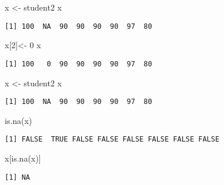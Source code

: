 \documentclass[
  letterpaper,
  DIV=11,
  numbers=noendperiod]{scrartcl}
\newenvironment{Shaded}{\begin{snugshade}}{\end{snugshade}}
\newcommand{\DecValTok}[1]{\textcolor[rgb]{0.68,0.00,0.00}{#1}}
\newcommand{\FunctionTok}[1]{\textcolor[rgb]{0.28,0.35,0.67}{#1}}
\newcommand{\NormalTok}[1]{\textcolor[rgb]{0.00,0.23,0.31}{#1}}
\newcommand{\OtherTok}[1]{\textcolor[rgb]{0.00,0.23,0.31}{#1}}
\begin{document}
\begin{Shaded}
\begin{Highlighting}[]
\NormalTok{x }\OtherTok{\textless{}{-}}\NormalTok{ student2}
\NormalTok{x}
\end{Highlighting}
\end{Shaded}

\begin{verbatim}
[1] 100  NA  90  90  90  90  97  80
\end{verbatim}

\begin{Shaded}
\begin{Highlighting}[]
\NormalTok{x[}\DecValTok{2}\NormalTok{]}\OtherTok{\textless{}{-}} \DecValTok{0}
\NormalTok{x}
\end{Highlighting}
\end{Shaded}

\begin{verbatim}
[1] 100   0  90  90  90  90  97  80
\end{verbatim}

\begin{Shaded}
\begin{Highlighting}[]
\NormalTok{x }\OtherTok{\textless{}{-}}\NormalTok{ student2}
\NormalTok{x}
\end{Highlighting}
\end{Shaded}

\begin{verbatim}
[1] 100  NA  90  90  90  90  97  80
\end{verbatim}

\begin{Shaded}
\begin{Highlighting}[]
\FunctionTok{is.na}\NormalTok{(x)}
\end{Highlighting}
\end{Shaded}

\begin{verbatim}
[1] FALSE  TRUE FALSE FALSE FALSE FALSE FALSE FALSE
\end{verbatim}

\begin{Shaded}
\begin{Highlighting}[]
\NormalTok{x[}\FunctionTok{is.na}\NormalTok{(x)]}
\end{Highlighting}
\end{Shaded}

\begin{verbatim}
[1] NA
\end{verbatim}
\end{document}
